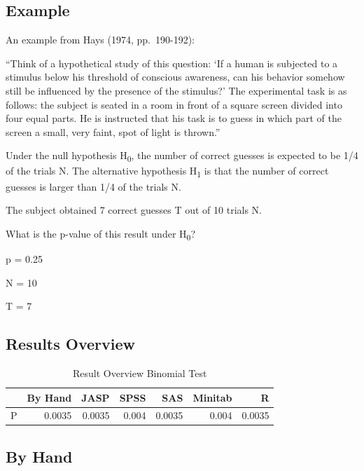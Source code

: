 \documentclass[
]{book}
\begin{document}
\hypertarget{example}{%
\subsection{Example}\label{example}}

An example from Hays (1974, pp.~190-192):

``Think of a hypothetical study of this question: `If a human is subjected to a stimulus below his threshold of conscious awareness, can his behavior somehow still be influenced by the presence of the stimulus?' The experimental task is as follows: the subject is seated in a room in front of a square screen divided into four equal parts. He is instructed that his task is to guess in which part of the screen a small, very faint, spot of light is thrown.''

Under the null hypothesis H\textsubscript{0}, the number of correct guesses is expected to be 1/4 of the trials N. The alternative hypothesis H\textsubscript{1} is that the number of correct guesses is larger than 1/4 of the trials N.

The subject obtained 7 correct guesses T out of 10 trials N.

What is the p-value of this result under H\textsubscript{0}?

p = 0.25

N = 10

T = 7

\hypertarget{results-overview}{%
\subsection{Results Overview}\label{results-overview}}

\begin{table}

\caption{\label{tab:unnamed-chunk-100}Result Overview Binomial Test}
\centering
\begin{tabular}[t]{lrrrrrr}
\toprule
  & By Hand & JASP & SPSS & SAS & Minitab & R\\
\midrule
P & 0.0035 & 0.0035 & 0.004 & 0.0035 & 0.004 & 0.0035\\
\bottomrule
\end{tabular}
\end{table}

\hypertarget{by-hand}{%
\subsection{By Hand}\label{by-hand}}
\end{document}
